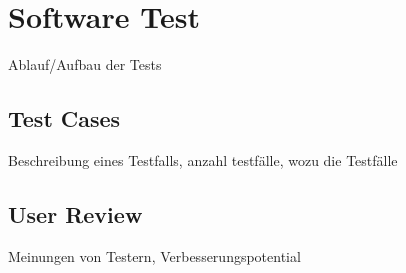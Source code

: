 \chapter{Software Test}

Ablauf/Aufbau der Tests


\section{Test Cases}

Beschreibung eines Testfalls, anzahl testfälle, wozu die Testfälle

\section{User Review}

Meinungen von Testern, Verbesserungspotential